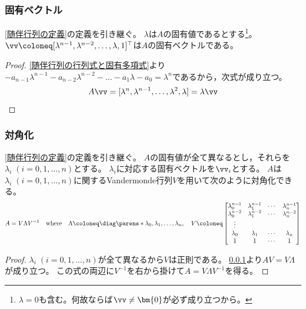             \subsubsection{固有ベクトル}
                \label{随伴行列の固有ベクトル}
                \begin{shadebox}
                    \ref{随伴行列の定義}の定義を引き継ぐ。
                    $\lambda$は$A$の固有値であるとする\footnote{$\lambda=0$も含む。何故ならば$\vv\neq\bm{0}$が必ず成り立つから。}。
                    $\vv\coloneq[\lambda^{n-1},\lambda^{n-2},\dots,\lambda,1]^\top$は$A$の固有ベクトルである。
                \end{shadebox}
                \begin{proof}
                    \ref{随伴行列の行列式と固有多項式}より$-a_{n-1}\lambda^{n-1}- a_{n-2}\lambda^{n-2} - \dots - a_1\lambda - a_0 = \lambda^n$であるから，次式が成り立つ。
                    \[ A\vv = [\lambda^n,\lambda^{n-1},\dots,\lambda^2,\lambda] = \lambda\vv \]
                \end{proof}
            \subsubsection{対角化}
                \begin{shadebox}
                    \ref{随伴行列の定義}の定義を引き継ぐ。
                    $A$の固有値が全て異なるとし，それらを$\lambda_i\;(i=0,1,\dots,n)$とする。
                    $\lambda_i$に対応する固有ベクトルを$\vv_i$とする。
                    $A$は$\lambda_i\;(i=0,1,\dots,n)$に関するVandermonde行列$V$を用いて次のように対角化できる。
                    \[
                        A = V\Lambda V^{-1}\quad\text{where}\quad\Lambda\coloneq\diag\parens*{\lambda_0,\lambda_1,\dots,\lambda_n},\quad V\coloneq\begin{bmatrix}
                            \lambda_0^{n-1} & \lambda_1^{n-1} & \cdots & \lambda_n^{n-1} \\
                            \lambda_0^{n-2} & \lambda_1^{n-2} & \cdots & \lambda_n^{n-2} \\
                            \vdots \\
                            \lambda_0 & \lambda_1 & \cdots & \lambda_n \\
                            1 & 1 & \cdots & 1
                        \end{bmatrix}
                    \]
                \end{shadebox}
                \begin{proof}
                    $\lambda_i\;(i=0,1,\dots,n)$が全て異なるから$V$は正則である。
                    \ref{随伴行列の固有ベクトル}より$AV = V\Lambda$が成り立つ。
                    この式の両辺に$V^{-1}$を右から掛けて$A = V\Lambda V^{-1}$を得る。
                \end{proof}
